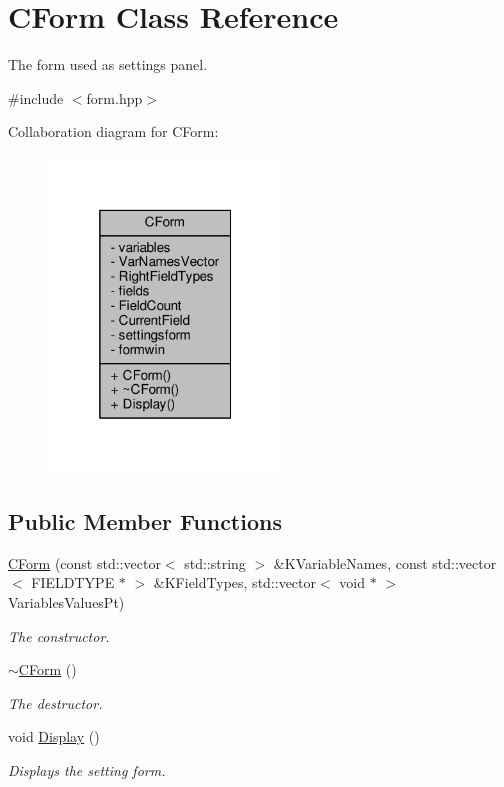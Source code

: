 \hypertarget{class_c_form}{\section{C\-Form Class Reference}
\label{class_c_form}
}


The form used as settings panel.  




{\ttfamily \#include $<$form.\-hpp$>$}



Collaboration diagram for C\-Form\-:
\nopagebreak
\begin{figure}[H]
\begin{center}
\leavevmode
\includegraphics[width=176pt]{class_c_form__coll__graph}
\end{center}
\end{figure}
\subsection*{Public Member Functions}
\begin{DoxyCompactItemize}
\item 
\hyperlink{class_c_form_a4437c27a5eeca382ad066037381a1424}{C\-Form} (const std\-::vector$<$ std\-::string $>$ \&K\-Variable\-Names, const std\-::vector$<$ F\-I\-E\-L\-D\-T\-Y\-P\-E $\ast$ $>$ \&K\-Field\-Types, std\-::vector$<$ void $\ast$ $>$ Variables\-Values\-Pt)
\begin{DoxyCompactList}\small\item\em The constructor. \end{DoxyCompactList}\item 
\hyperlink{class_c_form_a131fd2633df654300620aafeff3e6f7f}{$\sim$\-C\-Form} ()
\begin{DoxyCompactList}\small\item\em The destructor. \end{DoxyCompactList}\item 
void \hyperlink{class_c_form_ae690ac0bad444e2ad18b6b26eb9193a5}{Display} ()
\begin{DoxyCompactList}\small\item\em Displays the setting form. \end{DoxyCompactList}\end{DoxyCompactItemize}
